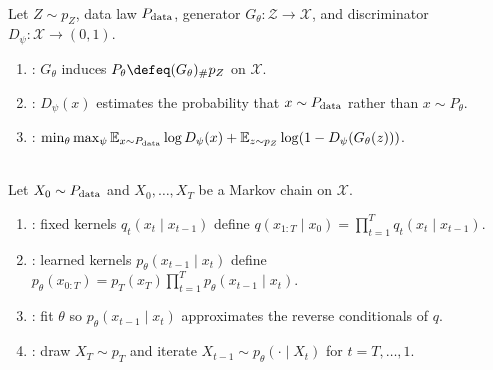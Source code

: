 \begin{definition} \label{def:sl-generative-adversarial-network} \\
Let $Z\sim p_Z$, data law $P_{\rm data}$, generator $G_\theta:\mathcal Z\to\mathcal X$, and discriminator $D_\psi:\mathcal X\to(0,1)$.
\begin{enumerate}[label=(\roman*)]
\setlength{\itemsep}{0pt}
\item {}: $G_\theta$ induces $P_\theta\defeq(G_\theta)_\#p_Z$ on $\mathcal X$.
\item {}: $D_\psi(x)$ estimates the probability that $x\sim P_{\rm data}$ rather than $x\sim P_\theta$.
\item {}: $\min_\theta\max_\psi\mathbb{E}_{x\sim P_{\rm data}}\log D_\psi(x)+\mathbb{E}_{z\sim p_Z}\log(1-D_\psi(G_\theta(z)))$.
\end{enumerate}
\end{definition}

\begin{definition} \label{def:sl-diffusion-model} \\
Let $X_0\sim P_{\rm data}$ and $X_0,\ldots,X_T$ be a Markov chain on $\mathcal X$.
\begin{enumerate}[label=(\roman*)]
\setlength{\itemsep}{0pt}
\item {}: fixed kernels $q_t(x_t\mid x_{t-1})$ define $q(x_{1:T}\mid x_0)=\prod_{t=1}^Tq_t(x_t\mid x_{t-1})$.
\item {}: learned kernels $p_\theta(x_{t-1}\mid x_t)$ define $p_\theta(x_{0:T})=p_T(x_T)\prod_{t=1}^Tp_\theta(x_{t-1}\mid x_t)$.
\item {}: fit $\theta$ so $p_\theta(x_{t-1}\mid x_t)$ approximates the reverse conditionals of $q$.
\item {}: draw $X_T\sim p_T$ and iterate $X_{t-1}\sim p_\theta(\cdot\mid X_t)$ for $t=T,\ldots,1$.
\end{enumerate}
\end{definition}
